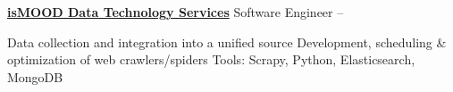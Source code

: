 \Entry
\href{http://ismood.gr}
{\textbf{isMOOD Data Technology Services}}
\Gap
\BulletItem
Software Engineer
\hfill
{} --
\begin{Detail}
	\SubBulletItem
	Data collection and integration into a unified source
	\SubBulletItem
	Development, scheduling \& optimization of web crawlers/spiders
	\SubBulletItem
	Tools: Scrapy, Python, Elasticsearch, MongoDB
\end{Detail}

%
